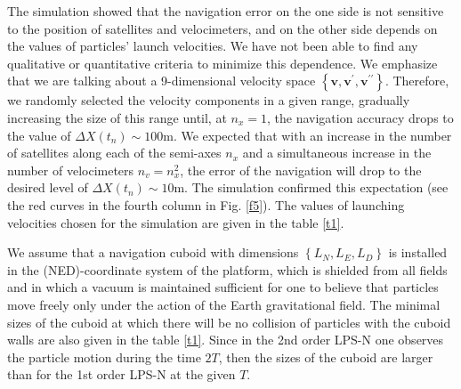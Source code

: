\documentclass[twocolumn,showpacs,preprintnumbers]{revtex4}
\begin{document}
The simulation showed that the navigation error on the one side is not
sensitive to the position of satellites and velocimeters, and on the other
side depends on the values of particles' launch velocities. We have not been
able to find any qualitative or quantitative criteria to minimize this
dependence. We emphasize that we are talking about a 9-dimensional velocity
space $\left\{ \mathbf{v,v}^{\prime }\mathbf{,v}^{\prime \prime }\right\} $.
Therefore, we randomly selected the velocity components in a given range,
gradually increasing the size of this range until, at $n_{x}=1$, the
navigation accuracy drops to the value of $\Delta X\left( t_{n}\right) \sim
100$m. We expected that with an increase in the number of satellites along
each of the semi-axes $n_{x}$ and a simultaneous increase in the number of
velocimeters $n_{v}=n_{x}^{2}$, the error of the navigation will drop to the
desired level of $\Delta X\left( t_{n}\right) \sim 10$m. The
simulation confirmed this expectation (see the red curves in the fourth
column in Fig. \ref{f5}). The values of launching velocities chosen for the
simulation are given in the table \ref{t1}.

We assume that a navigation cuboid with dimensions $\left\{
L_{N},L_{E},L_{D}\right\} $ is installed in the (NED)-coordinate system of
the platform, which is shielded from all fields and in which a vacuum is
maintained sufficient for one to believe that particles move freely only
under the action of the Earth gravitational field. The minimal sizes of the
cuboid at which there will be no collision of particles with the cuboid
walls are also given in the table \ref{t1}. Since in the 2nd order LPS-N one
observes the particle motion during the time $2T$, then the sizes of the
cuboid are larger than for the 1st order LPS-N at the given $T.$
\end{document}
